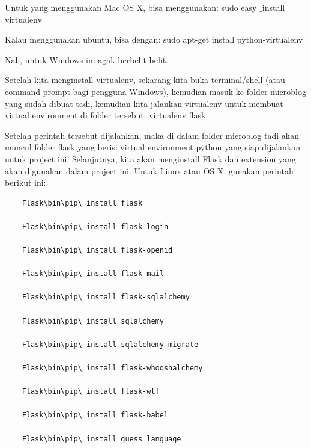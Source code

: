 {{{{\noindent 
{\fontsize{14pt}{14pt}\selectfont Untuk yang menggunakan Mac OS X, bisa menggunakan:\vspace{\baselineskip}
sudo easy $  \_  $install virtualenv \\} \par
\noindent 
{\fontsize{14pt}{14pt}\selectfont Kalau menggunakan ubuntu, bisa dengan:\vspace{\baselineskip}
sudo apt-get install python-virtualenv \\} \par
\noindent 
{\fontsize{14pt}{14pt}\selectfont Nah, untuk Windows ini agak berbelit-belit. \\} \par
\noindent 
{\fontsize{14pt}{14pt}\selectfont Setelah kita menginstall virtualenv, sekarang kita buka terminal/shell (atau command prompt bagi pengguna Windows), kemudian masuk ke folder microblog yang sudah dibuat tadi, kemudian kita jalankan virtualenv untuk membuat virtual environment di folder tersebut.\vspace{\baselineskip}
virtualenv flask \\} \par
\noindent 
{\fontsize{14pt}{14pt}\selectfont Setelah perintah tersebut dijalankan, maka di dalam folder microblog tadi akan muncul folder flask yang berisi virtual environment python yang siap dijalankan untuk project ini. Selanjutnya, kita akan menginstall Flask dan extension yang akan digunakan dalam project ini. Untuk Linux atau OS X, gunakan perintah berikut ini: \\} \par

\begin{verbatim}
	Flask\bin\pip\ install flask
	
	Flask\bin\pip\ install flask-login
	
	Flask\bin\pip\ install flask-openid
	
	Flask\bin\pip\ install flask-mail
	
	Flask\bin\pip\ install flask-sqlalchemy
	
	Flask\bin\pip\ install sqlalchemy
	
	Flask\bin\pip\ install sqlalchemy-migrate
	
	Flask\bin\pip\ install flask-whooshalchemy
	
	Flask\bin\pip\ install flask-wtf
	
	Flask\bin\pip\ install flask-babel
	
	Flask\bin\pip\ install guess_language
	

\end{verbatim}}}}}
